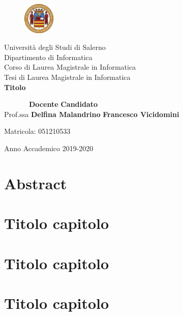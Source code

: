 \documentclass[14pt]{extreport}
\begin{document}
\begin{titlepage}
\begin{center}
	\begin{figure}
    	\includegraphics[width=1.5cm, height=1.5cm]{unisa.png}
    	\centering
    \end{figure}
	{\Large Università degli Studi di Salerno}\\[0.2truecm]
	{\large Dipartimento di Informatica\\Corso di Laurea Magistrale in Informatica}\\
	\hrulefill
	\vfill
	{\large Tesi di Laurea Magistrale in Informatica}\\[0.2truecm]
	\vfill\vfill
	{\LARGE {\bf Titolo}}
	
	\vfill\vfill
	
	
	\ \ \ \ \ \ \ {\bf Docente} \hfill {\bf Candidato}\ \ \\
	Prof.ssa \textbf{Delfina Malandrino} \hfill  \textbf{Francesco Vicidomini}
	\centerline{\hfill Matricola: 051210533}
	
	
	\vfill
	\hrulefill 
	\begin{center} Anno Accademico 2019-2020 \end{center}
	
\end{center}
\end{titlepage}

\setcounter{page}{1} 		

\newpage
	

\tableofcontents
\listoffigures %
\listoftables %




\chapter*{Abstract}
 




\chapter{Titolo capitolo}
\setcounter{page}{1} 		


\chapter{Titolo capitolo}


\chapter{Titolo capitolo}



\end{document}
